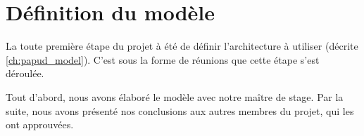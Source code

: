 \section{Définition du modèle}

La toute première étape du projet à été de définir l'architecture à utiliser (décrite \autoref{ch:papud_model}). C'est sous la forme de réunions que cette étape s'est déroulée.

Tout d'abord, nous avons élaboré le modèle avec notre maître de stage.
Par la suite, nous avons présenté nos conclusions aux autres membres du projet, qui les ont approuvées.
